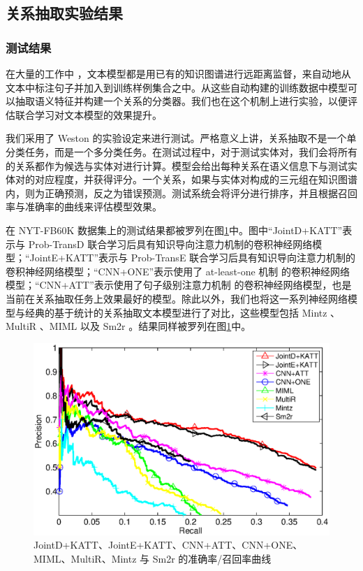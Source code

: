 \subsection{关系抽取实验结果}

\subsubsection{测试结果}

在大量的工作中 \cite{mintz2009distant,riedel2010modeling,hoffmann2011knowledge,surdeanu2012multi,zeng2014relation,zeng2015distant,lin2016neural}，文本模型都是用已有的知识图谱进行远距离监督，来自动地从文本中标注句子并加入到训练样例集合之中。从这些自动构建的训练数据中模型可以抽取语义特征并构建一个关系的分类器。我们也在这个机制上进行实验，以便评估联合学习对文本模型的效果提升。

我们采用了 Weston \cite{weston2013connecting}的实验设定来进行测试。严格意义上讲，关系抽取不是一个单分类任务，而是一个多分类任务。在测试过程中，对于测试实体对，我们会将所有的关系都作为候选与实体对进行计算。模型会给出每种关系在语义信息下与测试实体对的对应程度，并获得评分。一个关系，如果与实体对构成的三元组在知识图谱内，则为正确预测，反之为错误预测。测试系统会将评分进行排序，并且根据召回率与准确率的曲线来评估模型效果。

在 NYT-FB60K 数据集上的测试结果都被罗列在图\ref{fig3:jointcnn}中。图中``JointD+KATT''表示与 Prob-TransD 联合学习后具有知识导向注意力机制的卷积神经网络模型；``JointE+KATT''表示与 Prob-TransE 联合学习后具有知识导向注意力机制的卷积神经网络模型；``CNN+ONE''表示使用了 at-least-one 机制 \cite{zeng2015distant} 的卷积神经网络模型；``CNN+ATT''表示使用了句子级别注意力机制 \cite{lin2016neural} 的卷积神经网络模型，也是当前在关系抽取任务上效果最好的模型。除此以外，我们也将这一系列神经网络模型与经典的基于统计的关系抽取文本模型进行了对比，这些模型包括 Mintz \cite{mintz2009distant}、MultiR \cite{hoffmann2011knowledge}、MIML \cite{surdeanu2012multi} 以及 Sm2r \cite{weston2013connecting}。结果同样被罗列在图\ref{fig3:jointcnn}中。

\begin{figure}[h]
\centering
\includegraphics[width=0.9\columnwidth]{figures/ch3/res.eps}
\caption{JointD+KATT、JointE+KATT、CNN+ATT、CNN+ONE、MIML、MultiR、Mintz 与 Sm2r 的准确率/召回率曲线}
\label{fig3:jointcnn}
\end{figure} 

